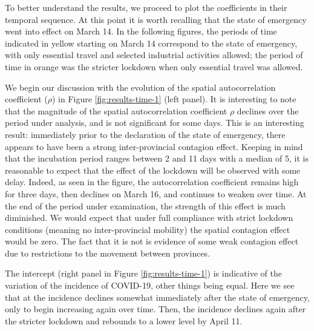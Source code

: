 \documentclass[]{elsarticle} %
\begin{document}
To better understand the results, we proceed to plot the coefficients in
their temporal sequence. At this point it is worth recalling that the
state of emergency went into effect on March 14. In the following
figures, the periods of time indicated in yellow starting on March 14
correspond to the state of emergency, with only essential travel and
selected industrial activities allowed; the period of time in orange was
the stricter lockdown when only essential travel was allowed.

We begin our discussion with the evolution of the spatial
autocorrelation coefficient (\(\rho\)) in Figure
\ref{fig:results-time-1} (left panel). It is interesting to note that
the magnitude of the spatial autocorrelation coefficient \(\rho\)
declines over the period under analysis, and is not significant for some
days. This is an interesting result: immediately prior to the
declaration of the state of emergency, there appears to have been a
strong inter-provincial contagion effect. Keeping in mind that the
incubation period ranges between 2 and 11 days with a median of 5, it is
reasonable to expect that the effect of the lockdown will be observed
with some delay. Indeed, as seen in the figure, the autocorrelation
coefficient remains high for three days, then declines on March 16, and
continues to weaken over time. At the end of the period under
examination, the strength of this effect is much diminished. We would
expect that under full compliance with strict lockdown conditions
(meaning no inter-provincial mobility) the spatial contagion effect
would be zero. The fact that it is not is evidence of some weak
contagion effect due to restrictions to the movement between provinces.

The intercept (right panel in Figure \ref{fig:results-time-1}) is
indicative of the variation of the incidence of COVID-19, other things
being equal. Here we see that at the incidence declines somewhat
immediately after the state of emergency, only to begin increasing again
over time. Then, the incidence declines again after the stricter
lockdown and rebounds to a lower level by April 11.
\end{document}
